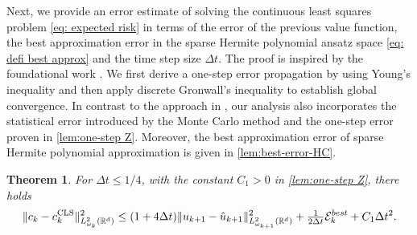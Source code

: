 \documentclass[10pt,a4paper]{amsart}
\numberwithin{equation}{section}
\numberwithin{algorithm}{section}
\theoremstyle{plain}
\newtheorem{theorem}{Theorem}[section]
\theoremstyle{remark}
\newcommand{\op}{\operatorname}
\newcommand{\R}{\mathbb{R}}
\begin{document}
Next, we provide an error estimate of solving the continuous least squares problem \cref{eq: expected risk} in terms of the error of the previous value function, the best approximation error in the sparse Hermite polynomial ansatz space \cref{eq: defi best approx} and the time step size $\Delta t$. The proof is inspired by the foundational work \cite{hure2020deep}. We first derive a one-step error propagation by using Young's inequality and then apply discrete Gronwall's inequality to establish global convergence. In contrast to the approach in \cite{hure2020deep}, our analysis also incorporates the statistical error introduced by the Monte Carlo method and the one-step error proven in \cref{lem:one-step Z}. Moreover, the best approximation error of sparse Hermite polynomial approximation is given in \cref{lem:best-error-HC}.
\begin{theorem} \label{thm: one-step error}
For $\Delta t \le 1/4$, with the constant $C_1>0$ in \cref{lem:one-step Z}, there holds
    \begin{equation*}
        \|c_k - c_k^{\op{CLS}}\|_{{L}^2_{\omega_k}(\R^d)}^2 \le (1 + 4 \Delta t) \|u_{k+1} - \hat{u}_{k+1}\|_{{L}^2_{\omega_{k+1}}(\R^d)}^2 + \tfrac{1}{2\Delta t} \mathcal{E}_k^{\rm best} + C_1 \Delta t^2.
    \end{equation*}
\end{theorem}
\end{document}
